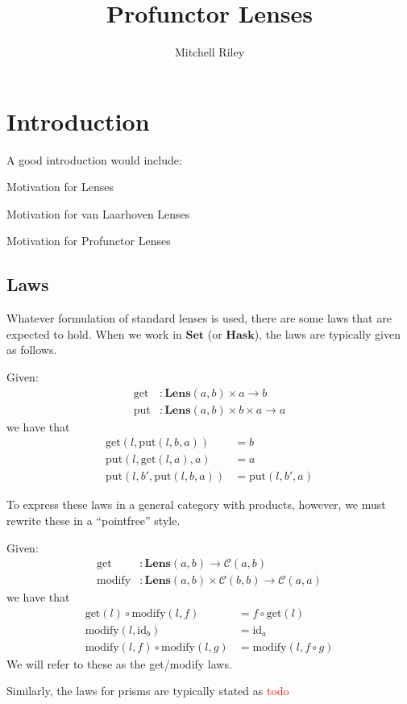 \documentclass[11pt,a4paper]{amsart}
\title{Profunctor Lenses}
\author{Mitchell Riley}
\theoremstyle{plain}
\theoremstyle{definition}
\newcommand{\id}{\mathrm{id}}
\newcommand{\C}{\mathscr{C}}
\newcommand{\Set}{\mathbf{Set}}
\newcommand{\Lens}{\mathbf{Lens}}
\newcommand{\Hask}{\mathbf{Hask}}
\newcommand{\fget}{\mathrm{get}}
\newcommand{\fput}{\mathrm{put}}
\newcommand{\fmodify}{\mathrm{modify}}
\newcommand{\todo}[1]{\textcolor{red}{\small #1}}
\begin{document}
\maketitle

\section{Introduction}

A good introduction would include:

Motivation for Lenses

Motivation for van Laarhoven Lenses

Motivation for Profunctor Lenses

\subsection{Laws}
Whatever formulation of standard lenses is used, there are some laws that are expected to hold. When we work in $\Set$ (or $\Hask$), the laws are typically given as follows.

Given:
\begin{align*}
\fget &: \Lens(a, b) \times a \to b \\
\fput &: \Lens(a, b) \times b \times a \to a
\end{align*}
we have that
\begin{align*}
\fget(l, \fput(l, b, a))   &= b \\
\fput(l, \fget(l, a), a)   &= a \\
\fput(l, b', \fput(l, b, a)) &= \fput(l, b', a)
\end{align*}

To express these laws in a general category with products, however, we must rewrite these in a ``pointfree'' style.

Given:
\begin{align*}
\fget &: \Lens(a, b) \to \C(a, b) \\
\fmodify &: \Lens(a, b) \times \C(b, b) \to \C(a, a)
\end{align*}
we have that
\begin{align*}
\fget(l) \circ \fmodify(l, f) &= f \circ \fget(l) \\
\fmodify(l, \id_b) &= \id_a \\
\fmodify(l, f) \circ \fmodify(l, g) &= \fmodify(l, f \circ g)
\end{align*}
We will refer to these as the get/modify laws.

Similarly, the laws for prisms are typically stated as
\todo{todo}
\end{document}
